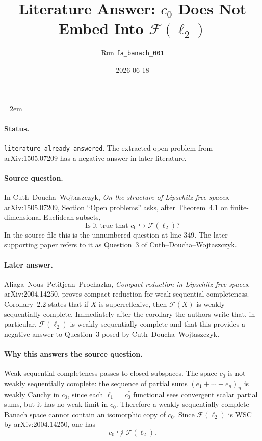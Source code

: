 \documentclass[11pt]{article}
\title{Literature Answer: \(c_0\) Does Not Embed Into \(\mathcal F(\ell_2)\)}
\author{Run \texttt{fa\_banach\_001}}
\date{2026-06-18}
\newcommand{\Free}{\mathcal F}
\begin{document}
\emergencystretch=2em
\maketitle

\paragraph{Status.}
\texttt{literature\_already\_answered}. The extracted open problem from
arXiv:1505.07209 has a negative answer in later literature.

\paragraph{Source question.}
In Cuth--Doucha--Wojtaszczyk, \emph{On the structure of Lipschitz-free spaces},
arXiv:1505.07209, Section ``Open problems'' asks, after Theorem~4.1 on
finite-dimensional Euclidean subsets,
\[
  \text{Is it true that } c_0 \hookrightarrow \Free(\ell_2)?
\]
In the source file this is the unnumbered question at line 349. The later
supporting paper refers to it as Question~3 of Cuth--Doucha--Wojtaszczyk.

\paragraph{Later answer.}
Aliaga--Nous--Petitjean--Prochazka, \emph{Compact reduction in Lipschitz free
spaces}, arXiv:2004.14250, proves compact reduction for weak sequential
completeness. Corollary~2.2 states that if \(X\) is superreflexive, then
\(\Free(X)\) is weakly sequentially complete. Immediately after the corollary
the authors write that, in particular, \(\Free(\ell_2)\) is weakly
sequentially complete and that this provides a negative answer to Question~3
posed by Cuth--Doucha--Wojtaszczyk.

\paragraph{Why this answers the source question.}
Weak sequential completeness passes to closed subspaces. The space \(c_0\) is
not weakly sequentially complete: the sequence of partial sums
\((e_1+\cdots+e_n)_n\) is weakly Cauchy in \(c_0\), since each
\(\ell_1=c_0^*\) functional sees convergent scalar partial sums, but it has no
weak limit in \(c_0\). Therefore a weakly sequentially complete Banach space
cannot contain an isomorphic copy of \(c_0\). Since \(\Free(\ell_2)\) is WSC by
arXiv:2004.14250, one has
\[
  c_0 \not\hookrightarrow \Free(\ell_2).
\]
\end{document}
